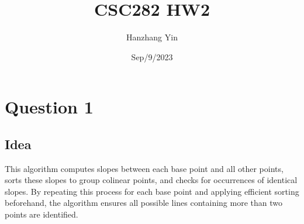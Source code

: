 \documentclass{article}
\title{CSC282 HW2}
\author{Hanzhang Yin}
\date{Sep/9/2023}
\begin{document}
\maketitle

\section*{Question 1}

\subsection*{Idea}
This algorithm computes slopes between each base point and all other points, sorts these slopes to group colinear points, and checks for occurrences of identical slopes. By repeating this process for each base point and applying efficient sorting beforehand, the algorithm ensures all possible lines containing more than two points are identified.
\end{document}
